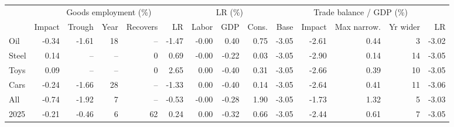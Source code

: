 \begin{tabular}{lrrrrrrrrrrrrr}
\toprule
 & \multicolumn{5}{c}{Goods employment (\%)} & \multicolumn{3}{c}{LR (\%)} & \multicolumn{5}{c}{Trade balance / GDP (\%)} \\
\cmidrule(lr){2-6}\cmidrule(lr){7-9}\cmidrule(lr){10-14}
 & Impact & Trough & Year & Recovers & LR & Labor & GDP & Cons. & Base & Impact & Max narrow. & Yr wider & LR \\
\midrule
Oil & -0.34 & -1.61 & 18 & -- & -1.47 & -0.00 & 0.40 & 0.75 & -3.05 & -2.61 & 0.44 & 3 & -3.02 \\
Steel & 0.14 & -- & -- & 0 & 0.69 & -0.00 & -0.22 & 0.03 & -3.05 & -2.90 & 0.14 & 14 & -3.05 \\
Toys & 0.09 & -- & -- & 0 & 2.65 & 0.00 & -0.40 & 0.31 & -3.05 & -2.66 & 0.39 & 10 & -3.05 \\
Cars & -0.24 & -1.66 & 28 & -- & -1.33 & 0.00 & -0.40 & 0.14 & -3.05 & -2.64 & 0.41 & 11 & -3.06 \\
All & -0.74 & -1.92 & 7 & -- & -0.53 & -0.00 & -0.28 & 1.90 & -3.05 & -1.73 & 1.32 & 5 & -3.03 \\
2025 & -0.21 & -0.46 & 6 & 62 & 0.24 & 0.00 & -0.32 & 0.66 & -3.05 & -2.44 & 0.61 & 7 & -3.05 \\
\bottomrule
\end{tabular}
